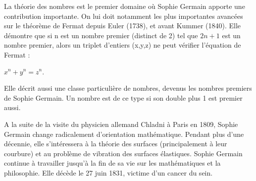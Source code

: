 La théorie des nombres est le premier domaine où Sophie Germain apporte une contribution importante. On lui doit notamment les plus importantes avancées sur le théorème de Fermat depuis Euler (1738), et avant Kummer (1840). Elle démontre que si n est un nombre premier (distinct de 2) tel que $2n+1$ est un nombre premier, alors un triplet d'entiers (x,y,z) ne peut vérifier l'équation de Fermat :
\begin{center}
$x^n + y^n = z^n$.
\end{center}
Elle décrit aussi une classe particulière de nombres, devenus les nombres premiers de Sophie Germain. Un nombre est de ce type si son double plus 1 est premier aussi.

A la suite de la visite du physicien allemand Chladni à Paris en 1809, Sophie Germain change radicalement d'orientation mathématique. Pendant plus d'une décennie, elle s'intéressera à la théorie des surfaces (principalement à leur courbure) et au problème de vibration des surfaces élastiques. Sophie Germain continue à travailler jusqu'à la fin de sa vie sur les mathématiques et la philosophie. Elle décède le 27 juin 1831, victime d'un cancer du sein.

